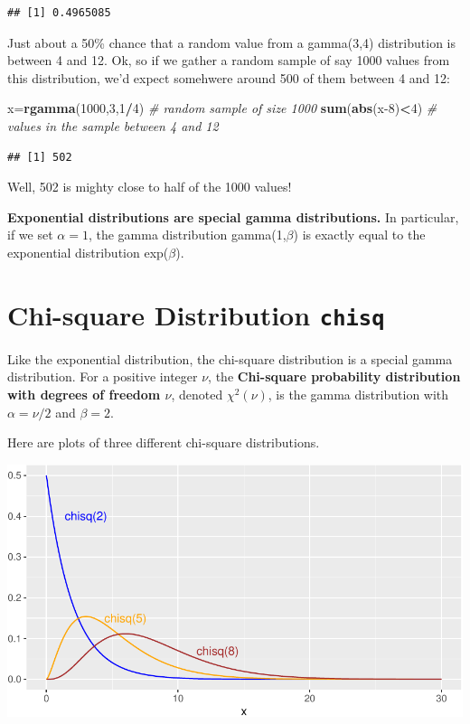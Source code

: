 \documentclass[
]{book}
\newenvironment{Shaded}{\begin{snugshade}}{\end{snugshade}}
\newcommand{\CommentTok}[1]{\textcolor[rgb]{0.56,0.35,0.01}{\textit{#1}}}
\newcommand{\DecValTok}[1]{\textcolor[rgb]{0.00,0.00,0.81}{#1}}
\newcommand{\FunctionTok}[1]{\textcolor[rgb]{0.13,0.29,0.53}{\textbf{#1}}}
\newcommand{\NormalTok}[1]{#1}
\newcommand{\OtherTok}[1]{\textcolor[rgb]{0.56,0.35,0.01}{#1}}
\newcommand{\SpecialCharTok}[1]{\textcolor[rgb]{0.81,0.36,0.00}{\textbf{#1}}}
\theoremstyle{definition}
\theoremstyle{definition}
\theoremstyle{definition}
\theoremstyle{definition}
\theoremstyle{remark}
\begin{document}
\begin{verbatim}
## [1] 0.4965085
\end{verbatim}

Just about a 50\% chance that a random value from a gamma(3,4) distribution is between 4 and 12. Ok, so if we gather a random sample of say 1000 values from this distribution, we'd expect somehwere around 500 of them between 4 and 12:

\begin{Shaded}
\begin{Highlighting}[]
\NormalTok{x}\OtherTok{=}\FunctionTok{rgamma}\NormalTok{(}\DecValTok{1000}\NormalTok{,}\DecValTok{3}\NormalTok{,}\DecValTok{1}\SpecialCharTok{/}\DecValTok{4}\NormalTok{) }\CommentTok{\# random sample of size 1000}
\FunctionTok{sum}\NormalTok{(}\FunctionTok{abs}\NormalTok{(x}\DecValTok{{-}8}\NormalTok{)}\SpecialCharTok{\textless{}}\DecValTok{4}\NormalTok{) }\CommentTok{\# values in the sample between 4 and 12}
\end{Highlighting}
\end{Shaded}

\begin{verbatim}
## [1] 502
\end{verbatim}

Well, 502 is mighty close to half of the 1000 values!

\textbf{Exponential distributions are special gamma distributions.} In particular, if we set \(\alpha=1\), the gamma distribution gamma(1,\(\beta\)) is exactly equal to the exponential distribution exp(\(\beta\)).

\section{\texorpdfstring{Chi-square Distribution \texttt{chisq}}{Chi-square Distribution chisq}}\label{chiR}

Like the exponential distribution, the chi-square distribution is a special gamma distribution. For a positive integer \(\nu\), the \textbf{Chi-square probability distribution with degrees of freedom \(\nu\)}, denoted \(\chi^2(\nu)\), is the gamma distribution with \(\alpha = \nu/2\) and \(\beta=2\).

Here are plots of three different chi-square distributions.

\begin{center}\includegraphics{math340-notes_files/figure-latex/unnamed-chunk-189-1} \end{center}
\end{document}
